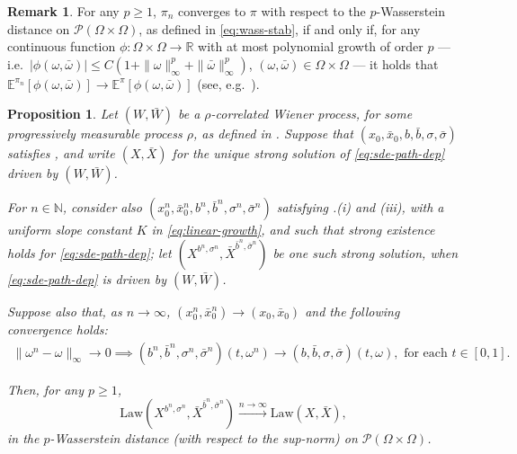 \documentclass[oneside]{amsart}
\newtheorem{proposition}[theorem]{Proposition}
\theoremstyle{definition}
\newtheorem{remark}[theorem]{Remark}
\newcommand{\Law}{\mathrm{Law}}
\newcommand{\N}{\mathbb N}
\newcommand{\R}{\mathbb R}
\newcommand{\Pc}{\mathcal P}
\def\E{{\mathbb E}}
\def\R{{\mathbb R}}
\numberwithin{equation}{section}
\begin{document}
\begin{remark}\label{rem:wass-p}
	For any $p \geq 1$, $\pi_n$ converges to $\pi$ with respect to the $p$-Wasserstein distance on $\Pc(\Omega \times \Omega)$, as defined in \eqref{eq:wass-stab}, if and only if, for any continuous function $\phi\colon \Omega \times \Omega \to \R$ with at most polynomial growth of order $p$ --- i.e.\ $|\phi(\omega, \bar\omega)| \leq C (1 + \|\omega\|_\infty^p + \|\bar\omega\|_\infty^p)$, $(\omega, \bar\omega)\in \Omega \times \Omega$ --- it holds that $\E^{\pi_n}[\phi(\omega, \bar\omega)] \to \E^\pi[\phi(\omega, \bar\omega)]$ (see, e.g.~\cite[Theorem 7.12]{Vi03}).
\end{remark}



\begin{proposition}\label{prop:stab_abstract}
Let $(W, \bar W)$ be a $\rho$-correlated Wiener process, for some progressively measurable process $\rho$, as defined in . 
Suppose that $(x_0, \bar x_0, b, \bar{b}, \sigma, \bar{\sigma})$ satisfies , and write $(X, \bar X)$ for the unique strong solution of \eqref{eq:sde-path-dep} driven by $(W, \bar W)$.

For $n \in \N$, consider also $(x^n_0, \bar x^n_0, b^n,\bar b^n,\sigma^n,\bar\sigma^n)$ satisfying .(i) and (iii), with a uniform slope constant $K$ in \eqref{eq:linear-growth}, and such that strong existence holds for \eqref{eq:sde-path-dep}; let $(X^{b^n, \sigma^n},\bar{X}^{\bar{b}^n, \bar{\sigma}^n})$ be one such strong solution, when \eqref{eq:sde-path-dep} is driven by $(W, \bar W)$.

Suppose also that, as $n \to \infty$, $(x^n_0,\bar x^n_0)\to(x_0,\bar x_0)$ and the following convergence holds:
\begin{align}\label{eq:unifconvassump_app}
\|\omega^n - \omega \|_\infty \to 0 \implies (b^n,\bar b^n,\sigma^n,\bar\sigma^n)(t,\omega^n)\to (b,\bar b,\sigma,\bar\sigma)(t,\omega), \text{ for each }t \in [0, 1].
\end{align}

Then, for any $p \geq 1$,
\begin{equation}
	\Law(X^{b^n, \sigma^n},\bar{X}^{\bar{b}^n, \bar{\sigma}^n}) \xrightarrow{n \to \infty} \Law(X,\bar X),
\end{equation}
in the $p$-Wasserstein distance (with respect to the sup-norm) on $\Pc(\Omega \times \Omega)$.
\end{proposition}
\end{document}
